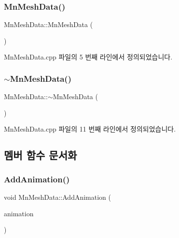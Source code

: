 \subsubsection{\texorpdfstring{Mn\+Mesh\+Data()}{MnMeshData()}}
{\footnotesize\ttfamily Mn\+Mesh\+Data\+::\+Mn\+Mesh\+Data (\begin{DoxyParamCaption}{ }\end{DoxyParamCaption})}



Mn\+Mesh\+Data.\+cpp 파일의 5 번째 라인에서 정의되었습니다.

\mbox{\label{class_m_n_l_1_1_mn_mesh_data_af1e38c31aa38a1ea459fd68d4be71df7}} 
\subsubsection{\texorpdfstring{$\sim$\+Mn\+Mesh\+Data()}{~MnMeshData()}}
{\footnotesize\ttfamily Mn\+Mesh\+Data\+::$\sim$\+Mn\+Mesh\+Data (\begin{DoxyParamCaption}{ }\end{DoxyParamCaption})}



Mn\+Mesh\+Data.\+cpp 파일의 11 번째 라인에서 정의되었습니다.



\subsection{멤버 함수 문서화}
\mbox{\label{class_m_n_l_1_1_mn_mesh_data_a484dd836ddd1ab819c72a05a6febe554}} 
\subsubsection{\texorpdfstring{Add\+Animation()}{AddAnimation()}}
{\footnotesize\ttfamily void Mn\+Mesh\+Data\+::\+Add\+Animation (\begin{DoxyParamCaption}\item[{const \hyperlink{class_m_n_l_1_1_mn_bone_animation}{Mn\+Bone\+Animation} \&}]{animation }\end{DoxyParamCaption})}



